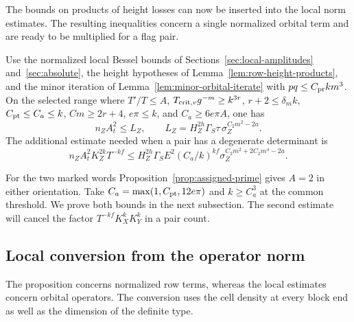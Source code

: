 

The bounds on products of height losses can now be inserted into the local norm estimates. The resulting inequalities concern a single normalized orbital term and are ready to be multiplied for a flag pair.

\begin{proposition}\label{prop:two-row-amplitude-bounds}
Use the normalized local Bessel bounds of
Sections~\ref{sec:local-amplitudes} and~\ref{sec:absolute},
the height hypotheses of Lemma~\ref{lem:row-height-products}, and
the minor iteration of Lemma~\ref{lem:minor-orbital-iterate}
with \(pq\le C_{\rm pr}km^3\).
On the selected range where
\(T'/T\le A\), \(T_{{\rm crit},v}g^{-m}\ge k^{3r}\),
\(r+2\le\delta_m k\), \(C_{\rm pt}\le C_a\le k\),
\(Cm\ge2r+4\), \(e\pi\le k\), and \(C_a\ge6e\pi A\), one has
\begin{equation}\label{eq:row-l2}
 n_Z A_t^2\le L_Z,\qquad
 L_Z=H_Z^{2h}\Gamma_S\tau\,\sigma_Z^{C_2m^2-2a}.
\end{equation}
The additional estimate needed when a pair has a degenerate determinant is
\begin{equation}\label{eq:row-abs}
 n_Z A_t^2 K_Z^{2k}T^{-kf}\le
 H_Z^{2h}\Gamma_S E^2(C_a/k)^{kf}
                 \sigma_Z^{C_2m^2+2C_2m^4-2a}.
\end{equation}
\end{proposition}

For the two marked words Proposition~\ref{prop:assigned-prime} gives \(A=2\) in either orientation. Take \(C_a=\max(1,C_{\rm pt},12e\pi)\) and \(k\ge C_a^3\) at the common threshold. 
We prove both bounds in the next subsection. The second estimate
will cancel the factor \(T^{-kf}K_X^kK_Y^k\) in a pair count.

\subsection{Local conversion from the operator norm}

The proposition concerns normalized row terms, whereas the local estimates concern orbital operators. The conversion uses the cell density at every block end as well as the dimension of the definite type.

